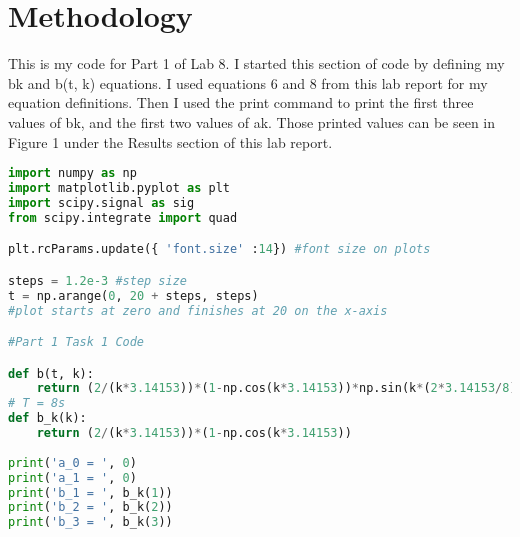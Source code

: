 \documentclass[12pt]{report}
\begin{document}
\section{Methodology}

This is my code for Part 1 of Lab 8. I started this section of code by defining my bk and b(t, k) equations. I used equations 6 and 8 from this lab report for my equation definitions. Then I used the print command to print the first three values of bk, and the first two values of ak. Those printed values can be seen in Figure 1 under the Results section of this lab report.
\begin{lstlisting}[language=Python]
import numpy as np
import matplotlib.pyplot as plt
import scipy.signal as sig
from scipy.integrate import quad

plt.rcParams.update({ 'font.size' :14}) #font size on plots

steps = 1.2e-3 #step size
t = np.arange(0, 20 + steps, steps) 
#plot starts at zero and finishes at 20 on the x-axis

#Part 1 Task 1 Code

def b(t, k):
    return (2/(k*3.14153))*(1-np.cos(k*3.14153))*np.sin(k*(2*3.14153/8)*t)
# T = 8s
def b_k(k):
    return (2/(k*3.14153))*(1-np.cos(k*3.14153))
    
print('a_0 = ', 0)
print('a_1 = ', 0)
print('b_1 = ', b_k(1))
print('b_2 = ', b_k(2))
print('b_3 = ', b_k(3))

\end{lstlisting}
\end{document}
